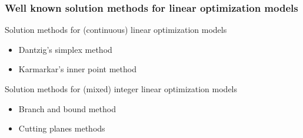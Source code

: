 \begin{frame}
 \frametitle{Well known solution methods for linear optimization models}
 \begin{block}{Solution methods for (continuous) linear optimization models}
  \begin{itemize}
    \item Dantzig's simplex method
    \item Karmarkar's inner point method
  \end{itemize}
 \end{block}
 \begin{block}{Solution methods for (mixed) integer linear optimization models}
  \begin{itemize}
    \item Branch and bound method
    \item Cutting planes methods
  \end{itemize}
 \end{block}
\end{frame}




